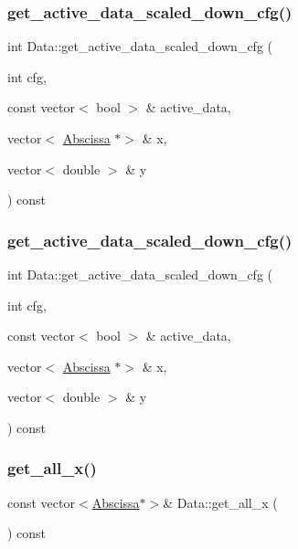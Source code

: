\subsubsection{\texorpdfstring{get\_active\_data\_scaled\_down\_cfg()}{get\_active\_data\_scaled\_down\_cfg()}\hspace{0.1cm}{\footnotesize\ttfamily [1/2]}}
{\footnotesize\ttfamily int Data\+::get\+\_\+active\+\_\+data\+\_\+scaled\+\_\+down\+\_\+cfg (\begin{DoxyParamCaption}\item[{int}]{cfg,  }\item[{const vector$<$ bool $>$ \&}]{active\+\_\+data,  }\item[{vector$<$ \mbox{\hyperlink{classAbscissa}{Abscissa}} $\ast$$>$ \&}]{x,  }\item[{vector$<$ double $>$ \&}]{y }\end{DoxyParamCaption}) const}

\mbox{\label{classData_a2852ff59adff1f77d3e0ce4c620fe501}} 
\subsubsection{\texorpdfstring{get\_active\_data\_scaled\_down\_cfg()}{get\_active\_data\_scaled\_down\_cfg()}\hspace{0.1cm}{\footnotesize\ttfamily [2/2]}}
{\footnotesize\ttfamily int Data\+::get\+\_\+active\+\_\+data\+\_\+scaled\+\_\+down\+\_\+cfg (\begin{DoxyParamCaption}\item[{int}]{cfg,  }\item[{const vector$<$ bool $>$ \&}]{active\+\_\+data,  }\item[{vector$<$ \mbox{\hyperlink{classAbscissa}{Abscissa}} $\ast$$>$ \&}]{x,  }\item[{vector$<$ double $>$ \&}]{y }\end{DoxyParamCaption}) const}

\mbox{\label{classData_a79204577812567531adde90797885b3e}} 
\subsubsection{\texorpdfstring{get\_all\_x()}{get\_all\_x()}\hspace{0.1cm}{\footnotesize\ttfamily [1/2]}}
{\footnotesize\ttfamily const vector$<$\mbox{\hyperlink{classAbscissa}{Abscissa}}$\ast$$>$\& Data\+::get\+\_\+all\+\_\+x (\begin{DoxyParamCaption}{ }\end{DoxyParamCaption}) const\hspace{0.3cm}{\ttfamily [inline]}}

